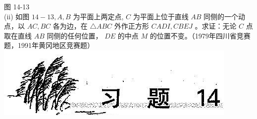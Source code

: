 \documentclass[10pt]{article}
\begin{document}
图 14-13\\
(ii) 如图 $14-13, A, B$ 为平面上两定点, $C$ 为平面上位于直线 $A B$ 同侧的一个动点，以 $A C, B C$ 各为边，在 $\triangle A B C$ 外作正方形 $C A D I, C B E J$ 。求证：无论 $C$ 点取在直线 $A B$ 同侧的任何位置， $D E$ 的中点 $M$ 的位置不变。（1979年四川省竞赛题，1991年黄冈地区竞赛题）\\
\includegraphics[max width=\textwidth, center]{2024_10_30_2c8f45efd4a519b08e1ag-134(1)}
\end{document}
